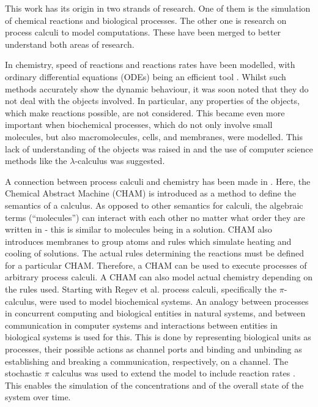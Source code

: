 ﻿This work has its origin in two strands of research. One of them is the simulation of chemical reactions and biological processes. The other one is research on process calculi to model computations. These have been merged  to better understand both areas of research. 

In chemistry, speed of reactions and reactions rates have been modelled, with ordinary differential equations (ODEs) being an efficient tool \cite{higham}. Whilst such methods accurately show the dynamic behaviour, it was soon noted that they do not deal with the objects involved. In particular, any properties of the objects, which make reactions possible, are not considered. This became even more important when biochemical processes, which do not only involve small molecules, but also macromolecules, cells, and membranes, were modelled. This lack of understanding of the objects was raised in \cite{fontana} and the use of computer science methods like the $\lambda$-calculus was suggested. 

A connection between process calculi and chemistry has been made in \cite{chamjournal}. Here, the Chemical Abstract Machine (CHAM) is introduced as a method to define the semantics of a calculus. As opposed to other semantics for calculi, the algebraic terms (``molecules'') can interact with each other no matter what order they are written in - this is similar to molecules being in a solution. CHAM also introduces membranes to group atoms and rules which simulate heating and cooling of solutions. The actual rules determining the reactions must be defined for a particular CHAM. Therefore, a CHAM can be used to execute processes of arbitrary process calculi. A CHAM can also model actual chemistry depending on the rules used. Starting with Regev et al. \cite{regev2000} process calculi, specifically the $\pi$-calculus, were used to model biochemical systems. An analogy between processes in concurrent computing and biological entities in natural systems, and between communication in computer systems and interactions between entities in biological systems is used for this. This is done by representing biological units as processes, their possible actions as channel ports and binding and unbinding as establishing and breaking a communication, respectively, on a channel. The stochastic $\pi$ calculus \cite{PriamiStochasticPi} was used to extend the model to include reaction rates \cite{PriameRegev}. This enables the simulation of the concentrations and of the overall state of the system over time. 

